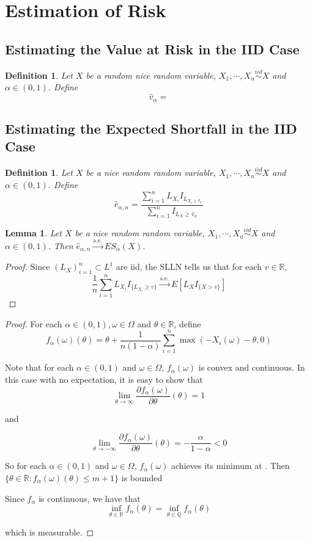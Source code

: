 \documentclass[12pt]{amsart}
\newtheorem{lem}[thm]{Lemma}
\newtheorem{defn}[thm]{Definition}
\newcommand{\al}{\alpha}
\newcommand{\om}{\omega}
\newcommand{\Om}{\Omega}
\newcommand{\R}{\mathbb{R}}
\newcommand{\Q}{\mathbb{Q}}
\newcommand{\convt}[1]{\xrightarrow{\text{#1}}}
\begin{document}
\section{Estimation of Risk}

\subsection{Estimating the Value at Risk in the IID Case}

\begin{defn}
Let $X$ be a random nice random variable, $X_1, \cdots , X_n \stackrel{iid}{\sim} X$ and $\al\in (0,1)$. Define $$\widehat{v}_\al = $$
\end{defn}

\subsection{Estimating the Expected Shortfall in the IID Case}

\begin{defn}
Let $X$ be a nice random random variable, $X_1, \cdots , X_n \stackrel{iid}{\sim} X$ and $\al\in (0,1)$. Define $$ \widehat{e}_{\al, n} = \frac{\sum_{i=1}^nL_{X_i}I_{L_{X_i \geq \widehat{v}_{\al}}}}{\sum_{i=1}^nI_{L_X \geq \widehat{v}_{\al}}} $$ 
\end{defn}

\begin{lem}
Let $X$ be a nice random random variable, $X_1, \cdots , X_n
\stackrel{iid}{\sim} X$ and $\al \in (0,1)$. Then $\widehat{e}_{\al, n} \convt{a.e.} ES_{\al}(X)$.
\end{lem}

\begin{proof}
	Since $(L_X)_{i = 1}^n \subset L^1$ are iid, the SLLN tells us that for each $v \in \R$, $$\frac{1}{n}\sum_{i=1}^n L_{X_i}I_{\{L_{X_i} \geq v\}} \convt{a.e.} E[L_XI_{\{X > v\}}]$$
\end{proof}

\begin{proof}
For each $\al\in (0,1), \om \in \Om$ and $\theta \in \R$, define $$f_{\al}(\om)(\theta) = \theta + \frac{1}{n (1-\al)} \sum_{i=1}^n\max(-X_i(\om) - \theta, 0) $$ 

Note that for each $\al\in (0,1)$ and $\om \in \Om$, $f_{\al}(\om)$ is convex and continuous. In this case with no expectation, it is easy to show that $$\lim_{\theta \rightarrow \infty}\frac{\partial f_{\al}(\om)}{\partial \theta}(\theta) = 1$$

and
 
$$\lim_{\theta \rightarrow -\infty}\frac{\partial f_{\al}(\om)}{\partial \theta}(\theta) = -\frac{\al}{1-\al} <0$$  

So for each $\al\in (0,1)$ and $\om \in \Om$, $f_{\al}(\om)$ achieves its minimum at . Then $\{\theta \in \R: f_{\al}(\om)(\theta)\leq m+1\}$ is bounded

Since $f_{\al}$ is continuous, we have that $$\inf_{\theta \in \R} f_{\al}(\theta) = \inf_{\theta \in \Q} f_{\al}(\theta)$$ 

which is measurable. 

\end{proof} 



\end{document}
